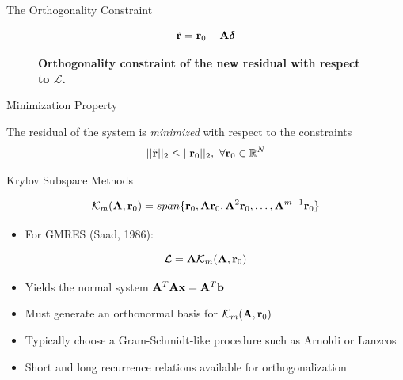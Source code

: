 \documentclass{beamer}
\begin{document}
\begin{frame}{The Orthogonality Constraint}

  \[
  \tilde{\mathbf{r}} = \mathbf{r}_0 - \mathbf{A}\boldsymbol{\delta}
  \]

  \begin{figure}[htpb!]
    \begin{center}
      \scalebox{1.1}{  }
    \end{center}
    \caption{\textbf{Orthogonality constraint of the new residual with
        respect to $\mathcal{L}$.}}
  \end{figure}

  \begin{beamerboxesrounded}[upper=boxheadcolor,lower=boxbodycolor,shadow=true]
    {Minimization Property}

    The residual of the system is \textit{minimized} with respect to
    the constraints
    \[
    ||\tilde{\mathbf{r}}||_2 \leq ||\mathbf{r}_0||_2,\ \forall \mathbf{r}_0 \in
    \mathbb{R}^N
    \]
  \end{beamerboxesrounded}

\end{frame}

\begin{frame}{Krylov Subspace Methods}

  \[
  \mathcal{K}_m(\mathbf{A},\mathbf{r}_0) = span\{\mathbf{r}_0, \mathbf{A}\mathbf{r}_0,
  \mathbf{A}^2\mathbf{r}_0, \dots, \mathbf{A}^{m-1}\mathbf{r}_0\}
  \]

  \begin{itemize}
  \item For GMRES (Saad, 1986):
  \end{itemize}
  \[
  \mathcal{L} = \mathbf{A} \mathcal{K}_m(\mathbf{A},\mathbf{r}_0)
  \]

  \begin{itemize}
  \item Yields the normal system $\mathbf{A}^T\mathbf{A}\mathbf{x} =
    \mathbf{A}^T\mathbf{b}$
  \item Must generate an orthonormal basis for
    $\mathcal{K}_m(\mathbf{A},\mathbf{r}_0)$
  \item Typically choose a Gram-Schmidt-like procedure such as Arnoldi
    or Lanzcos
  \item Short and long recurrence relations available for
    orthogonalization
  \end{itemize}

\end{frame}
\end{document}
